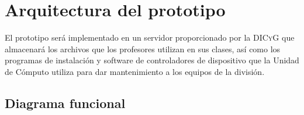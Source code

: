     \section {Arquitectura del prototipo}

El prototipo ser\'{a} implementado en un servidor proporcionado por la \textsc{DICyG} que almacenar\'{a} los archivos que los profesores utilizan en sus clases, as\'{i} como los programas de instalaci\'{o}n y software de controladores de dispositivo que la Unidad de C\'{o}mputo utiliza para dar mantenimiento a los equipos de la divisi\'{o}n.

      \subsection {Diagrama funcional}


